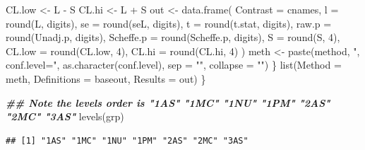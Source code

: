 \documentclass[
]{book}
\newenvironment{Shaded}{\begin{snugshade}}{\end{snugshade}}
\newcommand{\AttributeTok}[1]{\textcolor[rgb]{0.77,0.63,0.00}{#1}}
\newcommand{\DecValTok}[1]{\textcolor[rgb]{0.00,0.00,0.81}{#1}}
\newcommand{\DocumentationTok}[1]{\textcolor[rgb]{0.56,0.35,0.01}{\textbf{\textit{#1}}}}
\newcommand{\FunctionTok}[1]{\textcolor[rgb]{0.00,0.00,0.00}{#1}}
\newcommand{\NormalTok}[1]{#1}
\newcommand{\OtherTok}[1]{\textcolor[rgb]{0.56,0.35,0.01}{#1}}
\newcommand{\SpecialCharTok}[1]{\textcolor[rgb]{0.00,0.00,0.00}{#1}}
\newcommand{\StringTok}[1]{\textcolor[rgb]{0.31,0.60,0.02}{#1}}
\begin{document}
\begin{Shaded}
\begin{Highlighting}[]
\NormalTok{    CL.low }\OtherTok{\textless{}{-}}\NormalTok{ L }\SpecialCharTok{{-}}\NormalTok{ S}
\NormalTok{    CL.hi }\OtherTok{\textless{}{-}}\NormalTok{ L }\SpecialCharTok{+}\NormalTok{ S}
\NormalTok{    out }\OtherTok{\textless{}{-}} \FunctionTok{data.frame}\NormalTok{(}
      \AttributeTok{Contrast =}\NormalTok{ cnames, }\AttributeTok{l =} \FunctionTok{round}\NormalTok{(L, digits),}
      \AttributeTok{se =} \FunctionTok{round}\NormalTok{(seL, digits), }\AttributeTok{t =} \FunctionTok{round}\NormalTok{(t.stat, digits), }\AttributeTok{raw.p =} \FunctionTok{round}\NormalTok{(Unadj.p, digits),}
      \AttributeTok{Scheffe.p =} \FunctionTok{round}\NormalTok{(Scheffe.p, digits), }\AttributeTok{S =} \FunctionTok{round}\NormalTok{(S, }\DecValTok{4}\NormalTok{), }\AttributeTok{CL.low =} \FunctionTok{round}\NormalTok{(CL.low, }\DecValTok{4}\NormalTok{),}
      \AttributeTok{CL.hi =} \FunctionTok{round}\NormalTok{(CL.hi, }\DecValTok{4}\NormalTok{)}
\NormalTok{    )}
\NormalTok{    meth }\OtherTok{\textless{}{-}} \FunctionTok{paste}\NormalTok{(method, }\StringTok{", conf.level="}\NormalTok{, }\FunctionTok{as.character}\NormalTok{(conf.level), }\AttributeTok{sep =} \StringTok{""}\NormalTok{, }\AttributeTok{collapse =} \StringTok{""}\NormalTok{)}
\NormalTok{  \}}
  \FunctionTok{list}\NormalTok{(}\AttributeTok{Method =}\NormalTok{ meth, }\AttributeTok{Definitions =}\NormalTok{ baseout, }\AttributeTok{Results =}\NormalTok{ out)}
\NormalTok{\}}

\DocumentationTok{\#\# Note the levels order is "1AS" "1MC" "1NU" "1PM" "2AS" "2MC" "3AS"}
\FunctionTok{levels}\NormalTok{(grp)}
\end{Highlighting}
\end{Shaded}

\begin{verbatim}
## [1] "1AS" "1MC" "1NU" "1PM" "2AS" "2MC" "3AS"
\end{verbatim}
\end{document}
